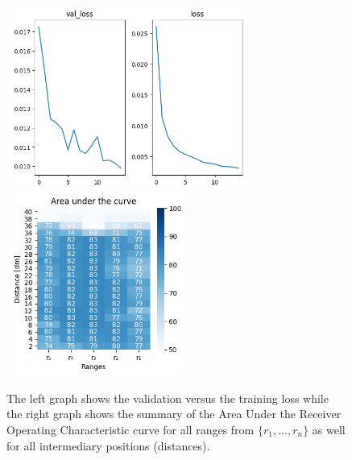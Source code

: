 \begin{multicols}{2}
\begin{itemize}
\end{itemize}
\end{multicols}\begin{figure}[H]%
\centering
\includegraphics[width=8cm,height=6cm]{3_models/models_43/graph_43.png}
\hspace{0.2 cm}
\includegraphics[width=6cm,height=6cm]{4_plots/plots_43/AUC_43.png}
\caption{The left graph shows the validation versus the training loss while the right graph shows the summary of the Area Under the Receiver Operating Characteristic curve for all ranges from $\{r_{1}, ... ,r_{n}\}$ as well for all intermediary positions (distances).}
\label{auc_43}
\end{figure}


\newpage
